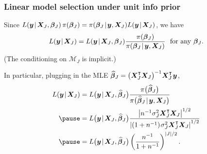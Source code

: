 \documentclass[18pt]{beamer}
\newcommand{\defineTightSpacing}{%
	\setlength{\abovedisplayskip}{.25\baselineskip}%
	\setlength{\belowdisplayskip}{.25\baselineskip}%
}
\renewcommand{\textsc}[1]{{\small \MakeUppercase{#1}}}
\newcommand{\given}{\mskip.7\thinmuskip | \mskip.7\thinmuskip}
\newcommand{\transpose}{\text{\raisebox{.5ex}{$\intercal$}}}
\newcommand{\thinnerspace}{\mskip.5\thinmuskip}
\newcommand{\density}{\operatorname{\pi}}
\newcommand{\likelihood}{L}
\newcommand{\by}{\bm{y}}
\newcommand{\bX}{\bm{X}}
\newcommand{\bbeta}{\bm{\beta}}
\newcommand{\model}{\mathcal{M}}
\newcommand{\nonzeroCoefSet}{J}
\begin{document}
\begin{frame}
\frametitle{Linear model selection under unit info prior}
Since $\likelihood(\by \given \bX_\nonzeroCoefSet, \bbeta_\nonzeroCoefSet) \density(\bbeta_\nonzeroCoefSet) = \density(\bbeta_\nonzeroCoefSet \given \by, \bX_\nonzeroCoefSet) \likelihood(\by \given \bX_\nonzeroCoefSet)$, we have
\pause
\begin{equation*} \defineTightSpacing%
\likelihood(\by \given \bX_\nonzeroCoefSet)
	= \likelihood(\by \given \bX_\nonzeroCoefSet, \bbeta_\nonzeroCoefSet) \frac{\density(\bbeta_\nonzeroCoefSet)}{\density(\bbeta_\nonzeroCoefSet \given \by, \bX_\nonzeroCoefSet)}
	\ \text{ for any } \bbeta_\nonzeroCoefSet.
\end{equation*}
\pause
(The conditioning on $\model_\nonzeroCoefSet$ is implicit.)


\pause
In particular, plugging in the \textsc{mle} $\widehat{\bbeta}_\nonzeroCoefSet = \left( \bX_\nonzeroCoefSet^\transpose \bX_\nonzeroCoefSet \right)^{-1} \! \bX_\nonzeroCoefSet^\transpose \thinnerspace \by$, 
\begin{equation*} \defineTightSpacing%
\begin{aligned}
\likelihood(\by \given \bX_\nonzeroCoefSet)
	&= \likelihood\big( \by \given \bX_\nonzeroCoefSet, \widehat{\bbeta}_\nonzeroCoefSet \big) \frac{\density\!\big( \widehat{\bbeta}_\nonzeroCoefSet  \big)}{\density\!\big(\widehat{\bbeta}_\nonzeroCoefSet \given \by, \bX_\nonzeroCoefSet \big)} \\
	\pause
	&= \likelihood\big( \by \given \bX_\nonzeroCoefSet, \widehat{\bbeta}_\nonzeroCoefSet \big)
	\frac{
		\left| n^{-1} \sigma_\nonzeroCoefSet^2 \bX_\nonzeroCoefSet^\transpose \bX_\nonzeroCoefSet \right|^{1/2}
	}{
		\left| (1 + n^{-1}) \thinnerspace \sigma_\nonzeroCoefSet^2 \bX_\nonzeroCoefSet^\transpose \bX_\nonzeroCoefSet \right|^{1/2}
	} \\
	\pause
	&= \likelihood\big( \by \given \bX_\nonzeroCoefSet, \widehat{\bbeta}_\nonzeroCoefSet \big) 
		\left( \frac{n^{-1}}{1 + n^{-1}} \right)^{| \nonzeroCoefSet | / 2}.
\end{aligned}
\end{equation*}
\end{frame}
\end{document}

